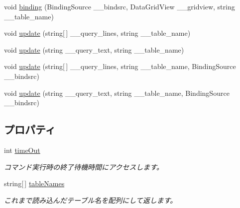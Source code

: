 \begin{DoxyCompactItemize}
void \hyperlink{classlazurite_1_1etherial_1_1_data_base_loader_ab776f005f4e3a8815485b4bbb48ccc88}{binding} (BindingSource \_\-\_\-bindsrc, DataGridView \_\-\_\-gridview, string \_\-\_\-table\_\-name)
\item 
void \hyperlink{classlazurite_1_1etherial_1_1_data_base_loader_a3f5190a29a3e7c70ff4411ad671a5cc6}{update} (string\mbox{[}$\,$\mbox{]} \_\-\_\-query\_\-lines, string \_\-\_\-table\_\-name)
\item 
void \hyperlink{classlazurite_1_1etherial_1_1_data_base_loader_ad1581f164cdf6a476d1bc1287169ea80}{update} (string \_\-\_\-query\_\-text, string \_\-\_\-table\_\-name)
\item 
void \hyperlink{classlazurite_1_1etherial_1_1_data_base_loader_a921d0ae9b16f7a3f79cc1a449548c12f}{update} (string\mbox{[}$\,$\mbox{]} \_\-\_\-query\_\-lines, string \_\-\_\-table\_\-name, BindingSource \_\-\_\-bindsrc)
\item 
void \hyperlink{classlazurite_1_1etherial_1_1_data_base_loader_adb2ac9982ec750d6535e5b4a29ed40a6}{update} (string \_\-\_\-query\_\-text, string \_\-\_\-table\_\-name, BindingSource \_\-\_\-bindsrc)
\end{DoxyCompactItemize}
\subsection*{プロパティ}
\begin{DoxyCompactItemize}
\item 
int \hyperlink{classlazurite_1_1etherial_1_1_data_base_loader_a7400e5d129dc9a8927b1178e484165a4}{timeOut}
\begin{DoxyCompactList}\small\item\em コマンド実行時の終了待機時間にアクセスします。 \item\end{DoxyCompactList}\item 
string\mbox{[}$\,$\mbox{]} \hyperlink{classlazurite_1_1etherial_1_1_data_base_loader_a247dd943cfe6c7618ff83dde4170451d}{tableNames}
\begin{DoxyCompactList}\small\item\em これまで読み込んだテーブル名を配列にして返します。 \item\end{DoxyCompactList}\end{DoxyCompactItemize}


